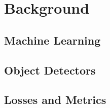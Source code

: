 

% 

\section{Background}

\subsection{Machine Learning}
\subsection{Object Detectors}
\subsection{Losses and Metrics}


% 